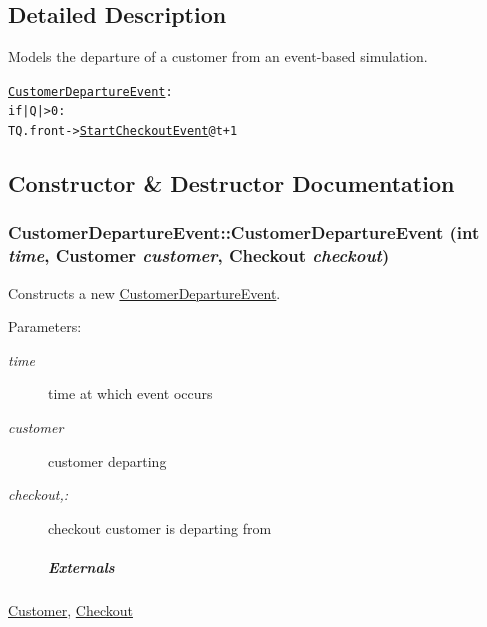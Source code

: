 \subsection{Detailed Description}
Models the departure of a customer from an event-based simulation. 

\small\begin{alltt}
 \hyperlink{class_customer_departure_event}{CustomerDepartureEvent}:
   if |Q| > 0:
     T Q.front -> \hyperlink{class_start_checkout_event}{StartCheckoutEvent} @ t+1
 \end{alltt}
\normalsize 
 

\subsection{Constructor \& Destructor Documentation}
\hypertarget{class_customer_departure_event_64ebee80dee23f6c0ca66fee9c514546}{
\subsubsection[{CustomerDepartureEvent}]{\setlength{\rightskip}{0pt plus 5cm}CustomerDepartureEvent::CustomerDepartureEvent (int {\em time}, \/  {\bf Customer} {\em customer}, \/  {\bf Checkout} {\em checkout})}}
\label{class_customer_departure_event_64ebee80dee23f6c0ca66fee9c514546}


Constructs a new \hyperlink{class_customer_departure_event}{CustomerDepartureEvent}. 

\begin{Desc}
\item[Parameters:]
\begin{description}
\item[{\em time}]time at which event occurs \item[{\em customer}]customer departing \item[{\em checkout,:}]checkout customer is departing from \subparagraph*{Externals}\end{description}
\end{Desc}
\hyperlink{class_customer}{Customer}, \hyperlink{class_checkout}{Checkout} 


